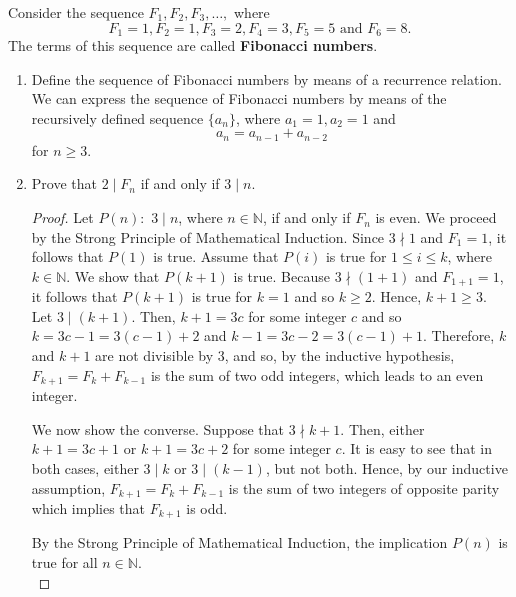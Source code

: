 \documentclass[12pt]{article}
\newcommand{\N}{\mathbb{N}}
\newenvironment{problem}[2][Problem]{\begin{trivlist}
		\item[\hskip \labelsep {\bfseries #1}\hskip \labelsep {\bfseries #2.}]}{\end{trivlist}}
\begin{document}
	\begin{problem}{44}
		Consider the sequence $F_{1}, F_{2}, F_{3}, \ldots,$ where
		\begin{equation*}
			F_{1} = 1,F_{2} = 1,F_{3} = 2,F_{4} = 3,F_{5} = 5 \text{ and } F_{6} = 8.
		\end{equation*}
	The terms of this sequence are called \textbf{Fibonacci numbers}.
	\begin{enumerate}[label=(\alph*)]
		\item  Define the sequence of Fibonacci numbers by means of a recurrence relation.\\
		
		We can express the sequence of Fibonacci numbers by means of the recursively defined sequence $\{a_{n}\}$, where $a_{1} =1, a_{2} = 1$ and
		\begin{equation*}
			a_{n} = a_{n-1} + a_{n-2}
		\end{equation*}
	for $n\geq 3$.
		
		\item Prove that $2\mid F_{n}$ if and only if $3\mid n$.
		\begin{proof}
			Let $P(n):$ $3\mid n$, where $n\in \N$, if and only if $F_{n}$ is even. We proceed by the Strong Principle of Mathematical Induction. Since $3\nmid 1$ and $F_{1} = 1$, it follows that $P(1)$ is true. Assume that $P(i)$ is true for $1\leq i \leq k$, where $k\in \N$. We show that $P(k+1)$ is true. Because $3 \nmid (1+1)$ and $F_{1+1} = 1$, it follows that $P(k+1)$ is true for $k=1$ and so $k\geq 2$. Hence, $k+1\geq 3$. \\
			
			Let $3\mid (k+1)$. Then, $k+1 = 3c$ for some integer $c$ and so $k = 3c-1 = 3(c-1)+2$ and $k-1 = 3c-2= 3(c-1)+1$. Therefore, $k$ and $k+1$ are not divisible by 3, and so, by the inductive hypothesis, $F_{k+1} = F_{k} + F_{k-1}$ is the sum of two odd integers, which leads to an even integer. 
			
			We now show the converse. Suppose that $3\nmid k+1$. Then, either $k+1 = 3c +1$ or $k+1 = 3c+2$ for some integer $c$. It is easy to see that in both cases, either $3\mid k$ or $3 \mid (k-1)$, but not both. Hence, by our inductive assumption, $F_{k+1} = F_{k} + F_{k-1}$ is the sum of two integers of opposite parity which implies that $F_{k+1}$ is odd. 
						
			By the Strong Principle of Mathematical Induction, the implication $P(n)$ is true for all $n\in \N$.\\
		\end{proof}
	\end{enumerate}
	\end{problem}
\end{document}
